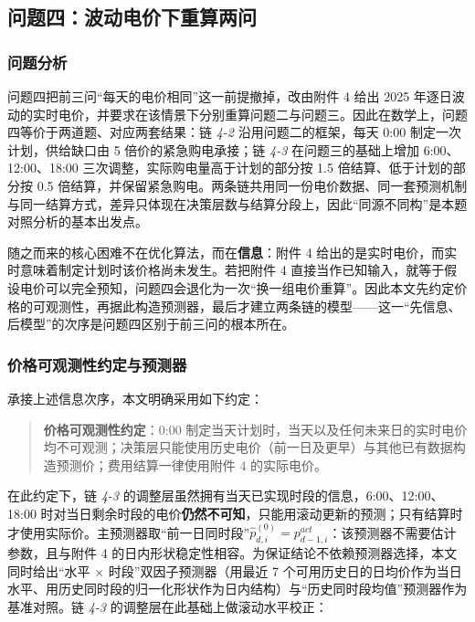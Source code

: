 \subsection{问题四：波动电价下重算两问}

\subsubsection{问题分析}

问题四把前三问“每天的电价相同”这一前提撤掉，改由附件 4 给出 2025 年逐日波动的实时电价，并要求在该情景下分别重算问题二与问题三。因此在数学上，问题四等价于两道题、对应两套结果：链 \emph{4-2} 沿用问题二的框架，每天 0:00 制定一次计划，供给缺口由 5 倍价的紧急购电承接；链 \emph{4-3} 在问题三的基础上增加 6:00、12:00、18:00 三次调整，实际购电量高于计划的部分按 1.5 倍结算、低于计划的部分按 0.5 倍结算，并保留紧急购电。两条链共用同一份电价数据、同一套预测机制与同一结算方式，差异只体现在决策层数与结算分段上，因此“同源不同构”是本题对照分析的基本出发点。

随之而来的核心困难不在优化算法，而在\textbf{信息}：附件 4 给出的是实时电价，而实时意味着制定计划时该价格尚未发生。若把附件 4 直接当作已知输入，就等于假设电价可以完全预知，问题四会退化为一次“换一组电价重算”。因此本文先约定价格的可观测性，再据此构造预测器，最后才建立两条链的模型——这一“先信息、后模型”的次序是问题四区别于前三问的根本所在。

\subsubsection{价格可观测性约定与预测器}

承接上述信息次序，本文明确采用如下约定：

\begin{quote}
\textbf{价格可观测性约定}：0:00 制定当天计划时，当天以及任何未来日的实时电价均不可观测；决策层只能使用历史电价（前一日及更早）与其他已有数据构造预测价；费用结算一律使用附件 4 的实际电价。
\end{quote}

在此约定下，链 \emph{4-3} 的调整层虽然拥有当天已实现时段的信息，6:00、12:00、18:00 时对当日剩余时段的电价\textbf{仍然不可知}，只能用滚动更新的预测；只有结算时才使用实际价。主预测器取“前一日同时段”$\hat p^{(0)}_{d,i}=p^{act}_{d-1,i}$：该预测器不需要估计参数，且与附件 4 的日内形状稳定性相容。为保证结论不依赖预测器选择，本文同时给出“水平 $\times$ 时段”双因子预测器（用最近 7 个可用历史日的日均价作为当日水平、用历史同时段的归一化形状作为日内结构）与“历史同时段均值”预测器作为基准对照。链 \emph{4-3} 的调整层在此基础上做滚动水平校正：

